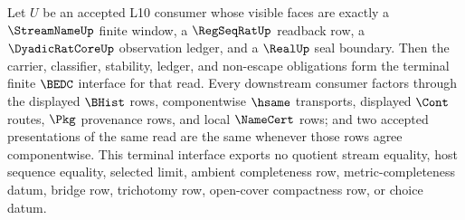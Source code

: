 \begin{theorem}
\label{thm:streamname-regseqrat-dyadic-real-obligation-terminality}
Let $U$ be an accepted L10 consumer whose visible faces are exactly a $\StreamNameUp$ finite window, a $\RegSeqRatUp$ readback row, a $\DyadicRatCoreUp$ observation ledger, and a $\RealUp$ seal boundary. Then the carrier, classifier, stability, ledger, and non-escape obligations form the terminal finite $\BEDC$ interface for that read. Every downstream consumer factors through the displayed $\BHist$ rows, componentwise $\hsame$ transports, displayed $\Cont$ routes, $\Pkg$ provenance rows, and local $\NameCert$ rows; and two accepted presentations of the same read are the same whenever those rows agree componentwise. This terminal interface exports no quotient stream equality, host sequence equality, selected limit, ambient completeness row, metric-completeness datum, bridge row, trichotomy row, open-cover compactness row, or choice datum.
\end{theorem}
